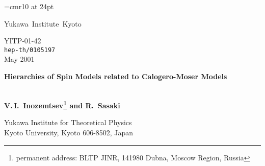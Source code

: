 \documentclass[a4paper,12pt]{article}
\begin{document}
%
\newcommand{\tabtopsp}[1]{\vbox{\vbox to#1{}\vbox to12pt{}}}
\font\larl=cmr10 at 24pt
\newcommand{\es}{\got s}

\newcommand{\preprint}{
            \begin{flushleft}
   \elevenmib Yukawa\, Institute\, Kyoto\\
            \end{flushleft}\vspace{-1.3cm}
            \begin{flushright}\normalsize  \sf
            YITP-01-42\\
           {\tt hep-th/0105197} \\ May 2001
            \end{flushright}}
\newcommand{\Title}[1]{{\baselineskip=26pt \begin{center}
            \Large   \bf #1 \\ \ \\ \end{center}}}
\hspace*{2.13cm}%
\hspace*{0.7cm}%
\newcommand{\Author}{\begin{center}\large \bf
           V.\,I.\, Inozemtsev\footnote{
permanent address: BLTP JINR, 141980 Dubna, Moscow Region, Russia}
 and R.\, Sasaki \end{center}}
\newcommand{\Address}{\begin{center}
            Yukawa Institute for Theoretical Physics\\
     Kyoto University, Kyoto 606-8502, Japan
      \end{center}}
\newcommand{\Accepted}[1]{\begin{center}{\large \sf #1}\\
            \vspace{1mm}{\small \sf Accepted for Publication}
            \end{center}}
\baselineskip=20pt

\preprint
\thispagestyle{empty}
\bigskip
\bigskip
\bigskip


\Title{Hierarchies of Spin Models related to Calogero-Moser Models}
\Author

\Address
\vspace{1cm}
\end{document}
